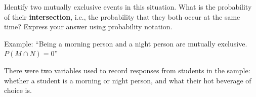 \documentclass[noanswers]{exam}
\begin{document}
\begin{questions}

\newpage

\question Identify two mutually exclusive events in this situation. What is the probability of their \textbf{intersection}, i.e., the probability that they both occur at the same time? Express your answer using probability notation.

\begin{solution}[\stretch{1}]

\vspace{3mm}

Example: ``Being a morning person and a night person are mutually exclusive. $P(M\cap N)=0$''

\vspace{3mm}
\end{solution} 

\question There were two variables used to record responses from students in the sample: whether a student is a morning or night person, and what their hot beverage of choice is. 


\end{questions}
\end{document}

